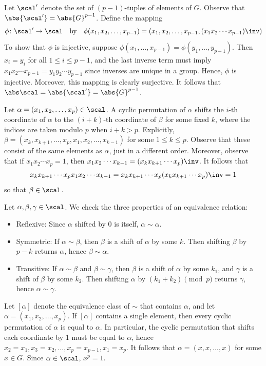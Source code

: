 \begin{solenum}
    \item Let $\scal'$ denote the set of $(p - 1)$-tuples of elements of $G$.
	Observe that $\abs{\scal'} = \abs{G}^{p-1}$.
	Define the mapping
    \[
    	\phi \colon \scal' \to \scal \quad \text{by} \quad \phi(x_1, x_2, \dots, x_{p-1}) = (x_1, x_2, \dots, x_{p-1}, (x_1x_2 \cdots x_{p-1})\inv)
    \]
    To show that $\phi$ is injective, suppose $\phi(x_1, \dots, x_{p-1}) = \phi(y_1, \dots, y_{p-1})$.
	Then $x_i = y_i$ for all $1 \leq i \leq p - 1$, and the last inverse term must imply $x_1x_2 \cdots x_{p - 1} = y_1y_2 \cdots y_{p - 1}$ since inverses are unique in a group.
	Hence, $\phi$ is injective.
	Moreover, this mapping is clearly surjective.
	It follows that $\abs\scal = \abs{\scal'} = \abs{G}^{p-1}$.
    \item Let $\alpha = (x_1, x_2, \dots, x_p) \in \scal$.
	A cyclic permutation of $\alpha$ shifts the $i$-th coordinate of $\alpha$ to the $(i + k)$-th coordinate of $\beta$ for some fixed $k$, where the indices are taken modulo $p$ when $i + k > p$.
	Explicitly, $\beta = (x_k, x_{k+1}, \dots, x_p, x_1, x_2, \dots, x_{k-1})$ for some $1 \leq k \leq p$.
	Observe that these consist of the same elements as $\alpha$, just in a different order.
	Moreover, observe that if $x_1x_2 \cdots x_p = 1$, then $x_1x_2 \cdots x_{k - 1} = (x_k x_{k + 1} \cdots x_p)\inv$.
	It follows that
    \[
    	x_k x_{k+1} \cdots x_p x_1 x_2 \cdots x_{k-1} = x_k x_{k + 1} \cdots x_p (x_k x_{k + 1} \cdots x_p)\inv = 1
    \]
    so that $\beta \in \scal$.
    \item Let $\alpha, \beta, \gamma \in \scal$.
	We check the three properties of an equivalence relation:
    \begin{itemize}
        \item Reflexive: Since $\alpha$ shifted by 0 is itself, $\alpha \sim \alpha$.
        \item Symmetric: If $\alpha \sim \beta$, then $\beta$ is a shift of $\alpha$ by some $k$.
	Then shifting $\beta$ by $p - k$ returns $\alpha$, hence $\beta \sim \alpha$.
        \item Transitive: If $\alpha \sim \beta$ and $\beta \sim \gamma$, then $\beta$ is a shift of $\alpha$ by some $k_1$, and $\gamma$ is a shift of $\beta$ by some $k_2$.
	Then shifting $\alpha$ by $(k_1 + k_2) \pmod p$ returns $\gamma$, hence $\alpha \sim \gamma$.
    \end{itemize}
    \rightimp Let $[\alpha]$ denote the equivalence class of $\sim$ that contains $\alpha$, and let $\alpha = (x_1, x_2, \dots, x_p)$.
	If $[\alpha]$ contains a single element, then every cyclic permutation of $\alpha$ is equal to $\alpha$.
	In particular, the cyclic permutation that shifts each coordinate by 1 must be equal to $\alpha$, hence $x_2 = x_1, x_3 = x_2, \dots, x_p = x_{p-1}, x_1 = x_p$.
	It follows that $\alpha = (x, x, \dots, x)$ for some $x \in G$.
	Since $\alpha \in \scal$, $x^p = 1$.
    

\end{solenum}
